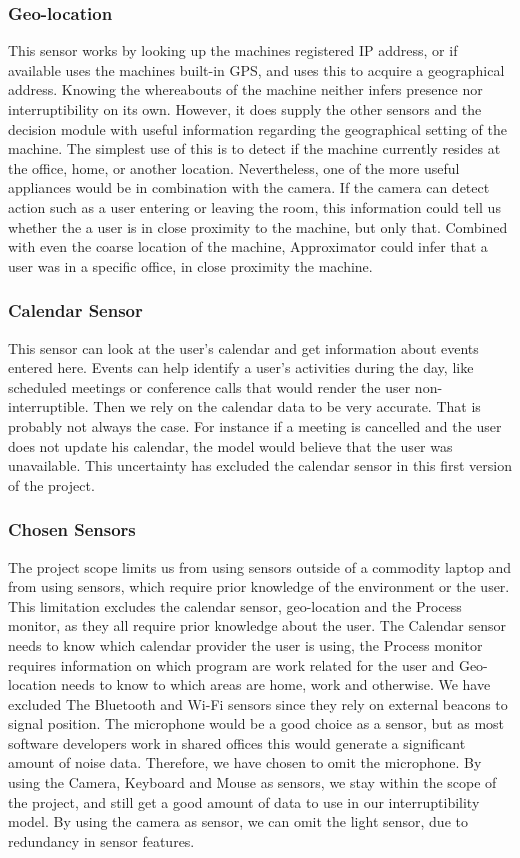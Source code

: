 \documentclass{sigchi}
\begin{document}
\subsubsection{Geo-location}
This sensor works by looking up the machines registered IP address, or if available uses the machines built-in GPS, and uses this to acquire a geographical address.
Knowing the whereabouts of the machine neither infers presence nor interruptibility on its own.
However, it does supply the other sensors and the decision module with useful information regarding the geographical setting of the machine.
The simplest use of this is to detect if the machine currently resides at the office, home, or another location.
Nevertheless, one of the more useful appliances would be in combination with the camera.
If the camera can detect action such as a user entering or leaving the room, this information could tell us whether the a user is in close proximity to the machine, but only that.
Combined with even the coarse location of the machine, Approximator could infer that a user was in a specific office, in close proximity the machine.

\subsubsection{Calendar Sensor}
This sensor can look at the user's calendar and get information about events entered here.
Events can help identify a user's activities during the day, like scheduled meetings or conference calls that would render the user non-interruptible.
Then we rely on the calendar data to be very accurate.
That is probably not always the case. For instance if a meeting is cancelled and the user does not update his calendar, the model would believe that the user was unavailable.
This uncertainty has excluded the calendar sensor in this first version of the project.

\subsubsection{Chosen Sensors}
The project scope limits us from using sensors outside of a commodity laptop and from using sensors, which require prior knowledge of the environment or the user.
This limitation excludes the calendar sensor, geo-location and the Process monitor, as they all require prior knowledge about the user.
The Calendar sensor needs to know which calendar provider the user is using, the Process monitor requires information on which program are work related for the user and Geo-location needs to know to which areas are home, work and otherwise.
We have excluded The Bluetooth and Wi-Fi sensors since they rely on external beacons to signal position.
The microphone would be a good choice as a sensor, but as most software developers work in shared offices this would generate a significant amount of noise data.
Therefore, we have chosen to omit the microphone.
By using the Camera, Keyboard and Mouse as sensors, we stay within the scope of the project, and still get a good amount of data to use in our interruptibility model.
By using the camera as sensor, we can omit the light sensor, due to redundancy in sensor features.
\end{document}
